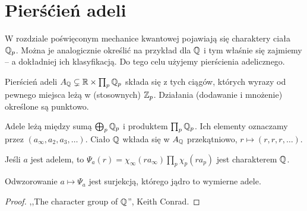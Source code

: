 \section{Pierśćień adeli}
W rozdziale poświęconym mechanice kwantowej pojawiają się charaktery ciała $\mathbb Q_p$.
Można je analogicznie określić na przykład dla $\mathbb Q$ i tym właśnie się zajmiemy -- a dokładniej ich klasyfikacją.
Do tego celu użyjemy pierścienia adelicznego.

\begin{definicja}
	Pierścień adeli $A_\mathbb Q \subsetneq \mathbb R \times \prod_p \mathbb Q_p$ składa się z tych ciągów, których wyrazy od pewnego miejsca leżą w (stosownych) $\mathbb Z_p$.
	Działania (dodawanie i mnożenie) określone są punktowo.
\end{definicja}

Adele leżą między sumą $\bigoplus_p \mathbb Q_p$ i produktem $\prod_p \mathbb Q_p$.
Ich elementy oznaczamy przez $(a_\infty, a_2, a_3, \ldots)$.
Ciało $\mathbb Q$ wkłada się w $A_\mathbb Q$ przekątniowo, $r \mapsto (r, r, r, \ldots)$.

\begin{definicja}
	Jeśli $a$ jest adelem, to $\Psi_a(r) = \chi_\infty(r a_\infty) \prod_p \chi_p(r a_p)$ jest charakterem $\mathbb Q$.
\end{definicja}

\begin{fakt}
	Odwzorowanie $a \mapsto \Psi_a$ jest surjekcją, którego jądro to wymierne adele.
\end{fakt}

\begin{proof}
	,,The character group of $\mathbb Q$'', Keith Conrad.
\end{proof}